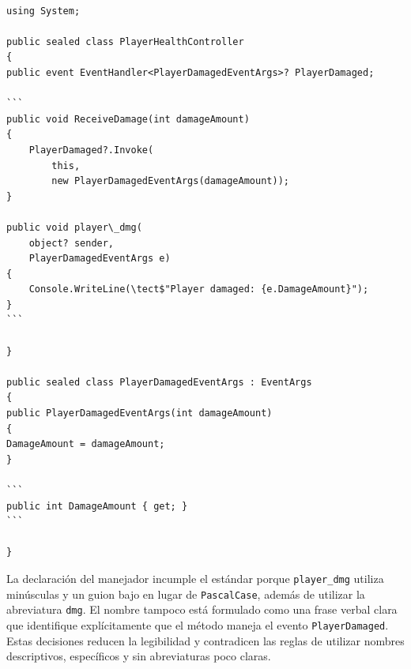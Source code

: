 \begin{lstlisting}[style=csharpstyle]

using System;

public sealed class PlayerHealthController
{
public event EventHandler<PlayerDamagedEventArgs>? PlayerDamaged;

```
public void ReceiveDamage(int damageAmount)
{
    PlayerDamaged?.Invoke(
        this,
        new PlayerDamagedEventArgs(damageAmount));
}

public void player\_dmg(
    object? sender,
    PlayerDamagedEventArgs e)
{
    Console.WriteLine(\tect$"Player damaged: {e.DamageAmount}");
}
```

}

public sealed class PlayerDamagedEventArgs : EventArgs
{
public PlayerDamagedEventArgs(int damageAmount)
{
DamageAmount = damageAmount;
}

```
public int DamageAmount { get; }
```

}

\end{lstlisting}

La declaración del manejador incumple el estándar porque \texttt{player\_dmg} utiliza minúsculas y un guion bajo en lugar de \texttt{PascalCase}, además de utilizar la abreviatura \texttt{dmg}. El nombre tampoco está formulado como una frase verbal clara que identifique explícitamente que el método maneja el evento \texttt{PlayerDamaged}. Estas decisiones reducen la legibilidad y contradicen las reglas de utilizar nombres descriptivos, específicos y sin abreviaturas poco claras.
